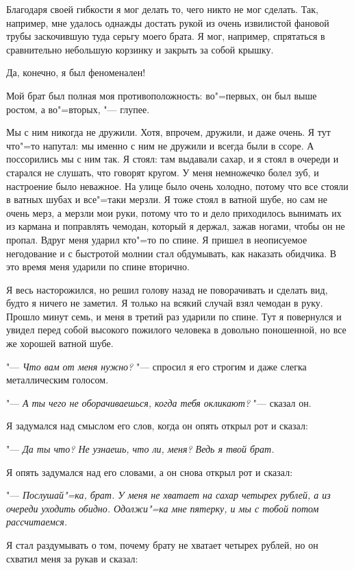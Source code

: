 Благодаря своей гибкости я мог делать то, чего никто не мог сделать. Так, например, мне удалось однажды достать рукой из очень извилистой фановой трубы заскочившую туда серьгу моего брата. Я мог, например, спрятаться в сравнительно небольшую корзинку и закрыть за собой крышку.

Да, конечно, я был феноменален!

Мой брат был полная моя противоположность: во"=первых, он был выше ростом, а во"=вторых, "--- глупее.

Мы с ним никогда не дружили. Хотя, впрочем, дружили, и даже очень. Я тут что"=то напутал: мы именно с ним не дружили и всегда были в ссоре. А поссорились мы с ним так. Я стоял: там выдавали сахар, и я стоял в очереди и старался не слушать, что говорят кругом. У меня немножечко болел зуб, и настроение было неважное. На улице было очень холодно, потому что все стояли в ватных шубах и все"=таки мерзли. Я тоже стоял в ватной шубе, но сам не очень мерз, а мерзли мои руки, потому что то и дело приходилось вынимать их из кармана и поправлять чемодан, который я держал, зажав ногами, чтобы он не пропал. Вдруг меня ударил кто"=то по спине. Я пришел в неописуемое негодование и с быстротой молнии стал обдумывать, как наказать обидчика. В это время меня ударили по спине вторично.

Я весь насторожился, но решил голову назад не поворачивать и сделать вид, будто я ничего не заметил. Я только на всякий случай взял чемодан в руку. Прошло минут семь, и меня в третий раз ударили по спине. Тут я повернулся и увидел перед собой высокого пожилого человека в довольно поношенной, но все же хорошей ватной шубе.

"--- \textit{Что вам от меня нужно?} "--- спросил я его строгим и даже слегка металлическим голосом.

"--- \textit{А ты чего не оборачиваешься, когда тебя окликают?} "--- сказал он.

Я задумался над смыслом его слов, когда он опять открыл рот и сказал:

"--- \textit{Да ты что? Не узнаешь, что ли, меня? Ведь я твой брат.}

Я опять задумался над его словами, а он снова открыл рот и сказал:

"--- \textit{Послушай"=ка, брат. У меня не хватает на сахар четырех рублей, а из очереди уходить обидно. Одолжи"=ка мне пятерку, и мы с тобой потом рассчитаемся.}

Я стал раздумывать о том, почему брату не хватает четырех рублей, но он схватил меня за рукав и сказал:

